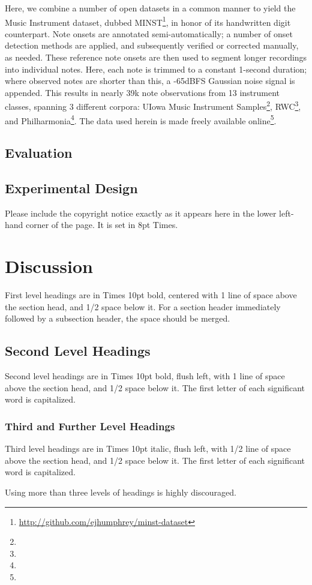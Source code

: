 \documentclass{article}
\begin{document}
Here, we combine a number of open datasets in a common manner to yield the Music Instrument dataset, dubbed MINST\footnote{\url{http://github.com/ejhumphrey/minst-dataset}}, in honor of its handwritten digit counterpart.
Note onsets are annotated semi-automatically;
a number of onset detection methods are applied, and subsequently verified or corrected manually, as needed.
These reference note onsets are then used to segment longer recordings into individual notes.
Here, each note is trimmed to a constant 1-second duration; where observed notes are shorter than this, a -65dBFS Gaussian noise signal is appended.
This results in nearly 39k note observations from 13 instrument classes, spanning 3 different corpora:
UIowa Music Instrument Samples\footnote{}, RWC\footnote{}, and Philharmonia\footnote{}.
The data used herein is made freely available online\footnote{}.


\subsection{Evaluation}



\subsection{Experimental Design}

Please include the copyright notice exactly as it appears here in the lower left-hand corner of the page.
It is set in 8pt Times.


\section{Discussion}

First level headings are in Times 10pt bold,
centered with 1 line of space above the section head, and 1/2 space below it.
For a section header immediately followed by a subsection header, the space should be merged.

\subsection{Second Level Headings}

Second level headings are in Times 10pt bold, flush left,
with 1 line of space above the section head, and 1/2 space below it.
The first letter of each significant word is capitalized.

\subsubsection{Third and Further Level Headings}

Third level headings are in Times 10pt italic, flush left,
with 1/2 line of space above the section head, and 1/2 space below it.
The first letter of each significant word is capitalized.

Using more than three levels of headings is highly discouraged.



\end{document}
